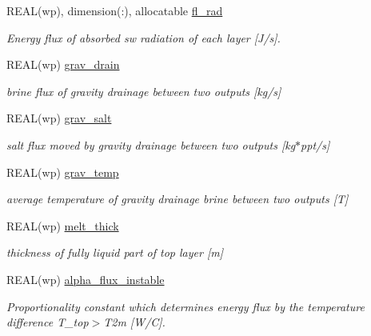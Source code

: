 \begin{DoxyCompactItemize}
REAL(wp), dimension(:), allocatable \hyperlink{namespacemo__data_aac6756d0384948c5717bdbabb4e1b748}{fl\_\-rad}
\begin{DoxyCompactList}\small\item\em Energy flux of absorbed sw radiation of each layer \mbox{[}J/s\mbox{]}. \item\end{DoxyCompactList}\item 
REAL(wp) \hyperlink{namespacemo__data_a7971f5dbfdde936f63647492b31dffe9}{grav\_\-drain}
\begin{DoxyCompactList}\small\item\em brine flux of gravity drainage between two outputs \mbox{[}kg/s\mbox{]} \item\end{DoxyCompactList}\item 
REAL(wp) \hyperlink{namespacemo__data_a084bb9d2856cdd8a9253f7790ac09b66}{grav\_\-salt}
\begin{DoxyCompactList}\small\item\em salt flux moved by gravity drainage between two outputs \mbox{[}kg$\ast$ppt/s\mbox{]} \item\end{DoxyCompactList}\item 
REAL(wp) \hyperlink{namespacemo__data_afd51dbc5cf51bbdec73b0c543d963da8}{grav\_\-temp}
\begin{DoxyCompactList}\small\item\em average temperature of gravity drainage brine between two outputs \mbox{[}T\mbox{]} \item\end{DoxyCompactList}\item 
REAL(wp) \hyperlink{namespacemo__data_ae1057f6ef957e6cae0ac381add3f3b73}{melt\_\-thick}
\begin{DoxyCompactList}\small\item\em thickness of fully liquid part of top layer \mbox{[}m\mbox{]} \item\end{DoxyCompactList}\item 
REAL(wp) \hyperlink{namespacemo__data_a14ac53f7afeb8965106ee70871b38006}{alpha\_\-flux\_\-instable}
\begin{DoxyCompactList}\small\item\em Proportionality constant which determines energy flux by the temperature difference T\_\-top$>$T2m \mbox{[}W/C\mbox{]}. \item\end{DoxyCompactList}\item 

\end{DoxyCompactItemize}
